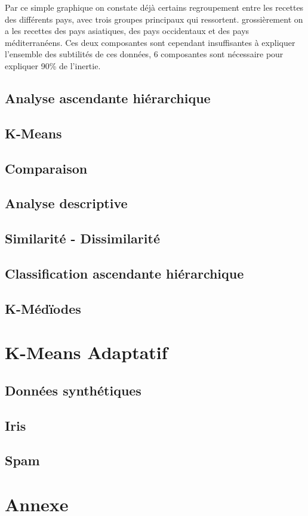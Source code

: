 \documentclass[a4paper, titlepage]{report}
\begin{document}
Par ce simple graphique on constate déjà certains regroupement entre les recettes des différents pays, avec trois groupes principaux qui ressortent. grossièrement on a les recettes des pays asiatiques, des pays occidentaux et des pays méditerranéens. Ces deux composantes sont cependant insuffisantes à expliquer l'ensemble des subtilités de ces données, 6 composantes sont nécessaire pour expliquer 90\% de l'inertie.


\section{Analyse ascendante hiérarchique}

\section{K-Means}

\section{Comparaison}

\section{Analyse descriptive}

\section{Similarité - Dissimilarité}

\section{Classification ascendante hiérarchique}

\section{K-Médïodes}



\chapter{K-Means Adaptatif}


\section{Données synthétiques}

\section{Iris}

\section{Spam}



\chapter*{Annexe}

\end{document}
